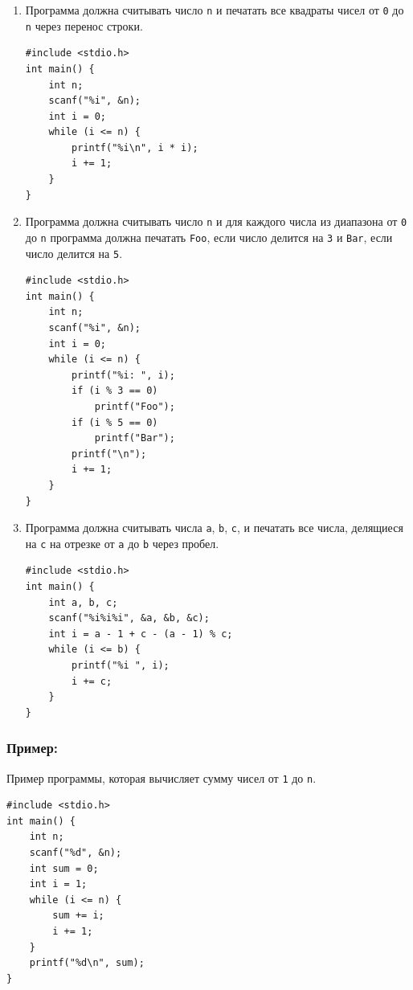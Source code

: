 \documentclass{article}
\begin{document}
\begin{enumerate}
\begin{lstlisting}[backgroundcolor = \color{solcolor}]
#include <stdio.h>
int main() {
    int n;
    scanf("%i", &n);
    int i = 0;
    while (i <= n) {
        printf("%i ", i);
        i += 1;
    }
}
\end{lstlisting}
\item Программа должна считывать число \texttt{n} и печатать все квадраты чисел от \texttt{0} до \texttt{n} через перенос строки.
\begin{lstlisting}[backgroundcolor = \color{solcolor}]
#include <stdio.h>
int main() {
    int n;
    scanf("%i", &n);
    int i = 0;
    while (i <= n) {
        printf("%i\n", i * i);
        i += 1;
    }
}
\end{lstlisting}
\item Программа должна считывать число \texttt{n} и для каждого числа из диапазона от \texttt{0} до \texttt{n} программа должна печатать \texttt{Foo}, если число делится на \texttt{3} и \texttt{Bar}, если число делится на \texttt{5}.
\begin{lstlisting}[backgroundcolor = \color{solcolor}]
#include <stdio.h>
int main() {
    int n;
    scanf("%i", &n);
    int i = 0;
    while (i <= n) {
        printf("%i: ", i);
        if (i % 3 == 0)
            printf("Foo");
        if (i % 5 == 0)
            printf("Bar");
        printf("\n");
        i += 1;
    }
}
\end{lstlisting}
\item Программа должна считывать числа \texttt{a}, \texttt{b}, \texttt{c}, и печатать все числа, делящиеся на \texttt{c} на отрезке от \texttt{a} до \texttt{b} через пробел.
\begin{lstlisting}[backgroundcolor = \color{solcolor}]
#include <stdio.h>
int main() {
    int a, b, c;
    scanf("%i%i%i", &a, &b, &c);
    int i = a - 1 + c - (a - 1) % c;
    while (i <= b) {
        printf("%i ", i);
        i += c;
    }
}

\end{lstlisting}
\end{enumerate}

\subsubsection*{Пример:}
Пример программы, которая вычисляет сумму чисел от \texttt{1} до \texttt{n}.
\begin{lstlisting}
#include <stdio.h>
int main() {
    int n;
    scanf("%d", &n);
    int sum = 0;
    int i = 1;
    while (i <= n) {
        sum += i;
        i += 1;
    }
    printf("%d\n", sum);
}
\end{lstlisting}
\end{document}
